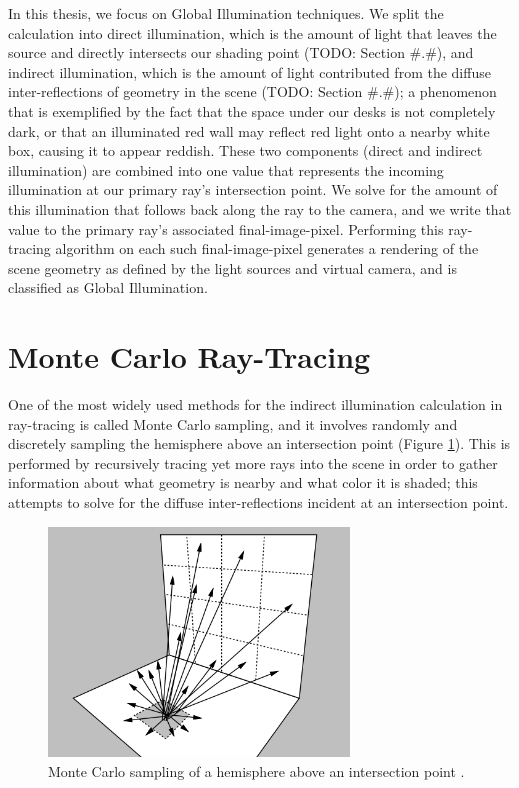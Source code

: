 In this thesis, we focus on Global Illumination techniques. We split the calculation into direct illumination, which is the amount of light that leaves the source and directly intersects our shading point (TODO: Section \#.\#), and indirect illumination, which is the amount of light contributed from the diffuse inter-reflections of geometry in the scene (TODO: Section \#.\#); a phenomenon that is exemplified by the fact that the space under our desks is not completely dark, or that an illuminated red wall may reflect red light onto a nearby white box, causing it to appear reddish. These two components (direct and indirect illumination) are combined into one value that represents the incoming illumination at our primary ray's intersection point. We solve for the amount of this illumination that follows back along the ray to the camera, and we write that value to the primary ray's associated final-image-pixel. Performing this ray-tracing algorithm on each such final-image-pixel generates a rendering of the scene geometry as defined by the light sources and virtual camera, and is classified as Global Illumination.

\section{Monte Carlo Ray-Tracing}
One of the most widely used methods for the indirect illumination calculation in ray-tracing is called Monte Carlo sampling, and it involves randomly and discretely sampling the hemisphere above an intersection point (Figure \ref{fig:monte_carlo}). This is performed by recursively tracing yet more rays into the scene in order to gather information about what geometry is nearby and what color it is shaded; this attempts to solve for the diffuse inter-reflections incident at an intersection point. 

\begin{figure}[h]
   \centering
   \includegraphics[width=80mm]{../img/shirley_monte_carlo.png}
   \captionfonts
   \caption{Monte Carlo sampling of a hemisphere above an intersection point \cite{bib:shirley1991}.}
   \label{fig:monte_carlo}
\end{figure}

